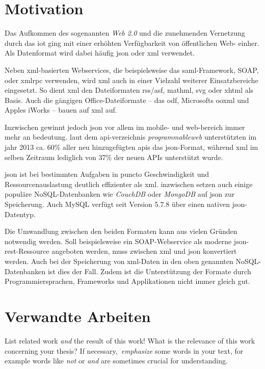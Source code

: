 \section{Motivation}
\label{sec:motivation}
Das Aufkommen des sogenannten \emph{Web 2.0} und die zunehmenden Vernetzung
durch das \gls{iot} ging mit einer erhöhten
Verfügbarkeit von öffentlichen Web- einher. Als Datenformat wird dabei
häufig \acrshort{json} oder \acrshort{xml} verwendet.

Neben \acrshort{xml}-basierten Webservices, die beispielsweise das \acrshort{saml}-Framework, SOAP,
oder \gls{xmlrpc} verwenden, wird \acrshort{xml} auch in einer Vielzahl weiterer
Einsatzbereiche eingesetzt. So dient \acrshort{xml} den Dateiformaten \acrshort{rss}/\acrshort{asf}, \acrshort{mathml},
\gls{svg} oder \gls{xhtml} als Basis. Auch die gängigen
Office-Dateiformate -- das \acrfull{odf}, Microsofts %
\acrfull{ooxml} und Apples iWorks -- bauen auf \acrshort{xml} auf. %

Inzwischen gewinnt jedoch \acrshort{json} vor allem im mobile-
und web-bereich immer mehr an bedeutung. laut dem api-verzeichnis
\emph{programmableweb} unterstützten im jahr 2013 ca. 60\% aller neu
hinzugefügten apis das \acrshort{json}-Format, während \acrshort{xml} im selben Zeitraum lediglich
von 37\% der neuen APIs unterstützt wurde.\cite{duvander2013convergence}

\acrshort{json} ist bei bestimmten Aufgaben in puncto Geschwindigkeit und
Ressourcenauslastung deutlich effizienter\cite{nurseitov2009comparison} als
\acrshort{xml}\@. inzwischen setzen auch einige populäre NoSQL-Datenbanken wie
\emph{CouchDB} oder \emph{MongoDB} auf \acrshort{json} zur Speicherung. Auch
MySQL verfügt seit Version 5.7.8 über einen nativen \acrshort{json}-Datentyp.

Die Umwandlung zwischen den beiden Formaten kann aus vielen Gründen
notwendig werden. Soll beispielsweise ein SOAP-Webservice als moderne
\acrshort{json}-\acrshort{rest}-Ressource angeboten werden, muss zwischen \acrshort{xml} und \acrshort{json} konvertiert
werden. Auch bei der Speicherung von \acrshort{xml}-Daten in den oben genannten NoSQL-Datenbanken
ist dies der Fall. Zudem ist die Unterstützung der Formate durch
Programmiersprachen, Frameworks und Applikationen nicht immer gleich gut.

\section{Verwandte Arbeiten}
List related work \emph{and} the result of this work\@! What is the relevance of this work concerning your thesis\@? If necessary,\ \emph{emphasize} some words in your text, for example words like \emph{not} or \emph{and} are sometimes crucial for understanding\@.

